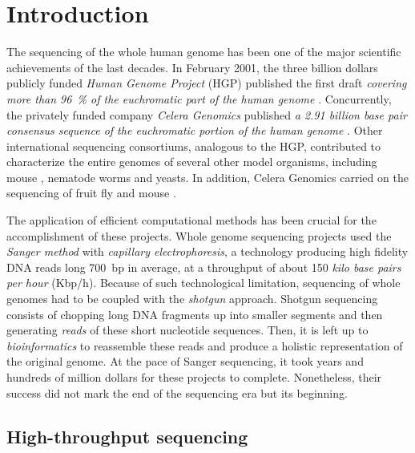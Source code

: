 \chapter{Introduction}

The sequencing of the whole human genome has been one of the major scientific achievements of the last decades.
In February 2001, the three billion dollars publicly funded \emph{Human Genome Project} (HGP) published the first draft \emph{covering more than 96~\% of the euchromatic part of the human genome} \citep{Consortium2001}.
Concurrently, the privately funded company \emph{Celera Genomics} published \emph{a 2.91 billion base pair consensus sequence of the euchromatic portion of the human genome} \citep{Venter2001}.
Other international sequencing consortiums, analogous to the HGP, contributed to characterize the entire genomes of several other model organisms, including mouse \citep{Chinwalla2002}, nematode worms \citep{Sulston1992} and yeasts.
In addition, Celera Genomics carried on the sequencing of fruit fly \citep{Myers2000} and mouse \citep{Mural2002}.

The application of efficient computational methods has been crucial for the accomplishment of these projects.
Whole genome sequencing projects used the \emph{Sanger method} \citep{Sanger1977} with \emph{capillary electrophoresis}, a technology producing high fidelity DNA reads long 700~bp in average, at a throughput of about 150 \emph{kilo base pairs per hour} (Kbp/h).
Because of such technological limitation, sequencing of whole genomes had to be coupled with the \emph{shotgun} approach.
Shotgun sequencing consists of chopping long DNA fragments up into smaller segments and then generating \emph{reads} of these short nucleotide sequences.
Then, it is left up to \emph{bioinformatics} to reassemble these reads and produce a holistic representation of the original genome.
At the pace of Sanger sequencing, it took years and hundreds of million dollars for these projects to complete.
Nonetheless, their success did not mark the end of the sequencing era but its beginning.


\section{High-throughput sequencing}

